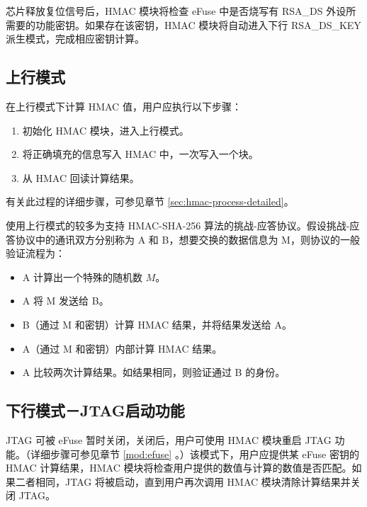 \documentclass[main\_\_CN.tex]{subfiles}
\begin{document}
\begin{tiplisting}
芯片释放复位信号后，HMAC 模块将检查 eFuse 中是否烧写有 RSA\_DS 外设所需要的功能密钥。如果存在该密钥，HMAC 模块将自动进入下行 RSA\_DS\_KEY 派生模式，完成相应密钥计算。
\end{tiplisting}

\subsection{上行模式}

在上行模式下计算 HMAC 值，用户应执行以下步骤：

\begin{enumerate}
    \item 初始化 HMAC 模块，进入上行模式。
    \item 将正确填充的信息写入 HMAC 中，一次写入一个块。
    \item 从 HMAC 回读计算结果。
\end{enumerate}

有关此过程的详细步骤，可参见章节 \ref{sec:hmac-process-detailed}。

\begin{tiplisting}
使用上行模式的较多为支持 HMAC-SHA-256 算法的挑战-应答协议。假设挑战-应答协议中的通讯双方分别称为 A 和 B，想要交换的数据信息为 M，则协议的一般验证流程为：

\begin{itemize}
    \item A 计算出一个特殊的随机数 $M$。
    \item A 将 M 发送给 B。
    \item B（通过 M 和密钥）计算 HMAC 结果，并将结果发送给 A。
    \item A（通过 M 和密钥）内部计算 HMAC 结果。
    \item A 比较两次计算结果。如结果相同，则验证通过 B 的身份。
\end{itemize}
\end{tiplisting}

\subsection{下行模式－JTAG启动功能}

JTAG 可被 eFuse 暂时关闭，关闭后，用户可使用 HMAC 模块重启 JTAG 功能。（详细步骤可参见章节 \ref{mod:efuse} \textit{}。）该模式下，用户应提供某 eFuse 密钥的 HMAC 计算结果，HMAC 模块将检查用户提供的数值与计算的数值是否匹配。如果二者相同，JTAG 将被启动，直到用户再次调用 HMAC 模块清除计算结果并关闭 JTAG。
\end{document}
